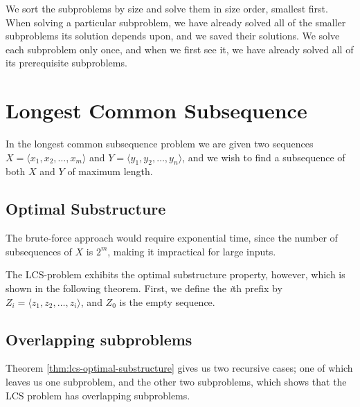 We sort the subproblems by size and solve them in size order, smallest first.
When solving a particular subproblem, we have already solved all of the
smaller subproblems its solution depends upon, and we saved their solutions.
We solve each subproblem only once, and when we first see it, we have already
solved all of its prerequisite subproblems.

\newpage
\section{Longest Common Subsequence}
In the longest common subsequence problem we are given two sequences $X =
\langle x_1, x_2, \dots, x_m \rangle$ and $Y = \langle y_1, y_2, \dots, y_n
\rangle$, and we wish to find a subsequence of both $X$ and $Y$ of maximum
length.

\subsection{Optimal Substructure}
The brute-force approach would require exponential time, since the number of
subsequences of $X$ is $2^m$, making it impractical for large inputs.

The LCS-problem exhibits the optimal substructure property, however, which is
shown in the following theorem. First, we define the \textit{i}th prefix by
$Z_i = \langle z_1, z_2, \dots, z_i \rangle$, and $Z_0$ is the empty sequence.



\subsection{Overlapping subproblems}
Theorem \ref{thm:lcs-optimal-substructure} gives us two recursive cases; one
of which leaves us one subproblem, and the other two subproblems, which shows
that the  LCS problem has overlapping subproblems.

